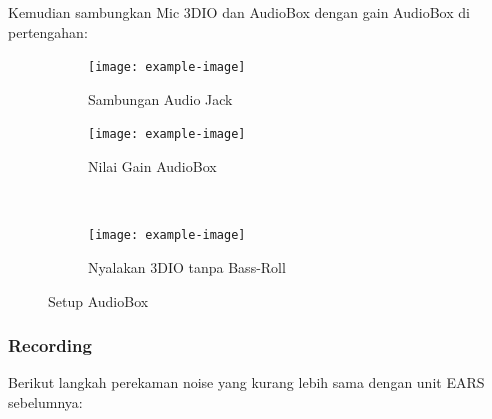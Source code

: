 \documentclass{article}
\begin{document}
	Kemudian sambungkan Mic 3DIO dan AudioBox dengan gain AudioBox di pertengahan:
	
	\begin{figure}[H]
		\centering
		\begin{subfigure}[]{.4\textwidth}
			\texttt{[image: example-image]}
			\caption{Sambungan Audio Jack}
		\end{subfigure}
		\begin{subfigure}[]{.4\textwidth}
			\texttt{[image: example-image]}
			\caption{Nilai Gain AudioBox}
		\end{subfigure}
		\\
		\begin{subfigure}[]{.4\textwidth}
			\texttt{[image: example-image]}
			\caption{Nyalakan 3DIO tanpa Bass-Roll}
		\end{subfigure}
		\caption{Setup AudioBox}
	\end{figure}

	\subsubsection{Recording}
	
	Berikut langkah perekaman noise yang kurang lebih sama dengan unit EARS sebelumnya:
	
\end{document}

